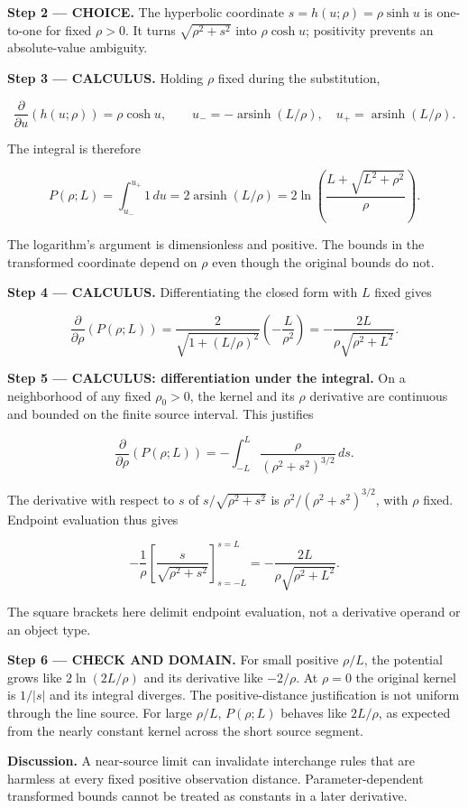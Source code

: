 \documentclass[11pt,oneside,openany]{book}
\begin{document}
\begin{ChoiceStep}
\textbf{Step 2 --- CHOICE.} The hyperbolic coordinate \(s=h(u;\rho)=\rho\sinh u\) is one-to-one for fixed \(\rho>0\). It turns \(\sqrt{\rho^2+s^2}\) into \(\rho\cosh u\); positivity prevents an absolute-value ambiguity.

\end{ChoiceStep}
\textbf{Step 3 --- CALCULUS.} Holding \(\rho\) fixed during the substitution,

\[
\frac{\partial}{\partial u}\left(h(u;\rho)\right)=\rho\cosh u,\qquad
u_-=-\operatorname{arsinh}(L/\rho),\quad u_+=\operatorname{arsinh}(L/\rho).
\]

The integral is therefore

\[
P(\rho;L)=\int_{u_-}^{u_+}1\,du=2\operatorname{arsinh}(L/\rho)
=2\ln\left(\frac{L+\sqrt{L^2+\rho^2}}{\rho}\right).
\]

The logarithm's argument is dimensionless and positive. The bounds in the transformed coordinate depend on \(\rho\) even though the original bounds do not.

\textbf{Step 4 --- CALCULUS.} Differentiating the closed form with \(L\) fixed gives

\[
\frac{\partial}{\partial\rho}\left(P(\rho;L)\right)
=\frac{2}{\sqrt{1+(L/\rho)^2}}\left(-\frac{L}{\rho^2}\right)
=-\frac{2L}{\rho\sqrt{\rho^2+L^2}}.
\]

\textbf{Step 5 --- CALCULUS: differentiation under the integral.} On a neighborhood of any fixed \(\rho_0>0\), the kernel and its \(\rho\) derivative are continuous and bounded on the finite source interval. This justifies

\[
\frac{\partial}{\partial\rho}\left(P(\rho;L)\right)
=-\int_{-L}^{L}\frac{\rho}{(\rho^2+s^2)^{3/2}}\,ds.
\]

The derivative with respect to \(s\) of \(s/\sqrt{\rho^2+s^2}\) is \(\rho^2/(\rho^2+s^2)^{3/2}\), with \(\rho\) fixed. Endpoint evaluation thus gives

\[
-\frac{1}{\rho}\left[\frac{s}{\sqrt{\rho^2+s^2}}\right]_{s=-L}^{s=L}
=-\frac{2L}{\rho\sqrt{\rho^2+L^2}}.
\]

The square brackets here delimit endpoint evaluation, not a derivative operand or an object type.

\begin{DomainStep}
\textbf{Step 6 --- CHECK AND DOMAIN.} For small positive \(\rho/L\), the potential grows like \(2\ln(2L/\rho)\) and its derivative like \(-2/\rho\). At \(\rho=0\) the original kernel is \(1/|s|\) and its integral diverges. The positive-distance justification is not uniform through the line source. For large \(\rho/L\), \(P(\rho;L)\) behaves like \(2L/\rho\), as expected from the nearly constant kernel across the short source segment.

\end{DomainStep}
\textbf{Discussion.} A near-source limit can invalidate interchange rules that are harmless at every fixed positive observation distance. Parameter-dependent transformed bounds cannot be treated as constants in a later derivative.
\clearpage
\end{document}
